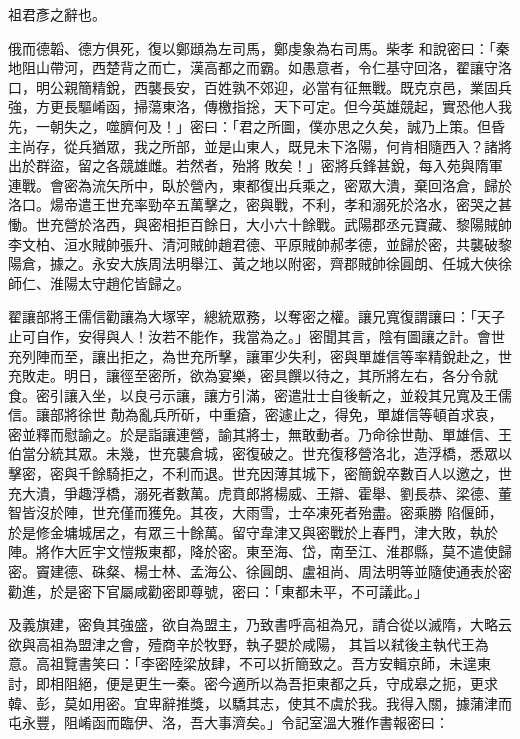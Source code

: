 \begin{pinyinscope}
 祖君彥之辭也。



 俄而德韜、德方俱死，復以鄭頲為左司馬，鄭虔象為右司馬。柴孝
 和說密曰：「秦地阻山帶河，西楚背之而亡，漢高都之而霸。如愚意者，令仁基守回洛，翟讓守洛口，明公親簡精銳，西襲長安，百姓孰不郊迎，必當有征無戰。既克京邑，業固兵強，方更長驅崤函，掃蕩東洛，傳檄指捴，天下可定。但今英雄競起，實恐他人我先，一朝失之，噬臍何及！」密曰：「君之所圖，僕亦思之久矣，誠乃上策。但昏主尚存，從兵猶眾，我之所部，並是山東人，既見未下洛陽，何肯相隨西入？諸將出於群盜，留之各競雄雌。若然者，殆將
 敗矣！」密將兵鋒甚銳，每入苑與隋軍連戰。會密為流矢所中，臥於營內，東都復出兵乘之，密眾大潰，棄回洛倉，歸於洛口。煬帝遣王世充率勁卒五萬擊之，密與戰，不利，孝和溺死於洛水，密哭之甚慟。世充營於洛西，與密相拒百餘日，大小六十餘戰。武陽郡丞元寶藏、黎陽賊帥李文柏、洹水賊帥張升、清河賊帥趙君德、平原賊帥郝孝德，並歸於密，共襲破黎陽倉，據之。永安大族周法明舉江、黃之地以附密，齊郡賊帥徐圓朗、任城大俠徐
 師仁、淮陽太守趙佗皆歸之。



 翟讓部將王儒信勸讓為大塚宰，總統眾務，以奪密之權。讓兄寬復謂讓曰：「天子止可自作，安得與人！汝若不能作，我當為之。」密聞其言，陰有圖讓之計。會世充列陣而至，讓出拒之，為世充所擊，讓軍少失利，密與單雄信等率精銳赴之，世充敗走。明日，讓徑至密所，欲為宴樂，密具饌以待之，其所將左右，各分令就食。密引讓入坐，以良弓示讓，讓方引滿，密遣壯士自後斬之，並殺其兄寬及王儒信。讓部將徐世
 勣為亂兵所斫，中重瘡，密遽止之，得免，單雄信等頓首求哀，密並釋而慰諭之。於是詣讓連營，諭其將士，無敢動者。乃命徐世勣、單雄信、王伯當分統其眾。未幾，世充襲倉城，密復破之。世充復移營洛北，造浮橋，悉眾以擊密，密與千餘騎拒之，不利而退。世充因薄其城下，密簡銳卒數百人以邀之，世充大潰，爭趣浮橋，溺死者數萬。虎賁郎將楊威、王辯、霍舉、劉長恭、梁德、董智皆沒於陣，世充僅而獲免。其夜，大雨雪，士卒凍死者殆盡。密乘勝
 陷偃師，於是修金墉城居之，有眾三十餘萬。留守韋津又與密戰於上春門，津大敗，執於陣。將作大匠宇文愷叛東都，降於密。東至海、岱，南至江、淮郡縣，莫不遣使歸密。竇建德、硃粲、楊士林、孟海公、徐圓朗、盧祖尚、周法明等並隨使通表於密勸進，於是密下官屬咸勸密即尊號，密曰：「東都未平，不可議此。」



 及義旗建，密負其強盛，欲自為盟主，乃致書呼高祖為兄，請合從以滅隋，大略云欲與高祖為盟津之會，殪商辛於牧野，執子嬰於咸陽，
 其旨以弒後主執代王為意。高祖覽書笑曰：「李密陸梁放肆，不可以折簡致之。吾方安輯京師，未遑東討，即相阻絕，便是更生一秦。密今適所以為吾拒東都之兵，守成皋之扼，更求韓、彭，莫如用密。宜卑辭推獎，以驕其志，使其不虞於我。我得入關，據蒲津而屯永豐，阻崤函而臨伊、洛，吾大事濟矣。」令記室溫大雅作書報密曰：




\end{pinyinscope}
